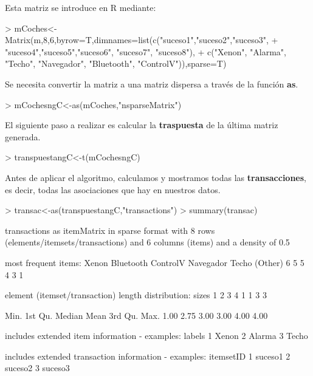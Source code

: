 \documentclass [a4paper] {article}
\begin{document}
{\bigskip
Esta matriz se introduce en R mediante:
\begin{Schunk}
\begin{Sinput}
> mCoches<-Matrix(m,8,6,byrow=T,dimnames=list(c("suceso1","suceso2","suceso3",
+ "suceso4","suceso5","suceso6", "suceso7", "suceso8"),
+ c("Xenon", "Alarma", "Techo", "Navegador", "Bluetooth", "ControlV")),sparse=T)
\end{Sinput}
\end{Schunk}

\bigskip
Se necesita convertir la matriz a una matriz dispersa a través de la función \textbf{as}.
\begin{Schunk}
\begin{Sinput}
> mCochesngC<-as(mCoches,"nsparseMatrix")
\end{Sinput}
\end{Schunk}

\bigskip
El siguiente paso a realizar es calcular la \textbf{traspuesta} de la última matriz generada.
\begin{Schunk}
\begin{Sinput}
> transpuestangC<-t(mCochesngC)
\end{Sinput}
\end{Schunk}

\bigskip
Antes de aplicar el algoritmo, calculamos y mostramos todas las \textbf{transacciones}, es decir, todas las asociaciones
que hay en nuestros datos.
\begin{Schunk}
\begin{Sinput}
> transac<-as(transpuestangC,"transactions")
> summary(transac)
\end{Sinput}
\begin{Soutput}
transactions as itemMatrix in sparse format with
 8 rows (elements/itemsets/transactions) and
 6 columns (items) and a density of 0.5 

most frequent items:
    Xenon Bluetooth  ControlV Navegador     Techo   (Other) 
        6         5         5         4         3         1 

element (itemset/transaction) length distribution:
sizes
1 2 3 4 
1 1 3 3 

   Min. 1st Qu.  Median    Mean 3rd Qu.    Max. 
   1.00    2.75    3.00    3.00    4.00    4.00 

includes extended item information - examples:
  labels
1  Xenon
2 Alarma
3  Techo

includes extended transaction information - examples:
  itemsetID
1   suceso1
2   suceso2
3   suceso3
\end{Soutput}
\end{Schunk}

}
\end{document}
